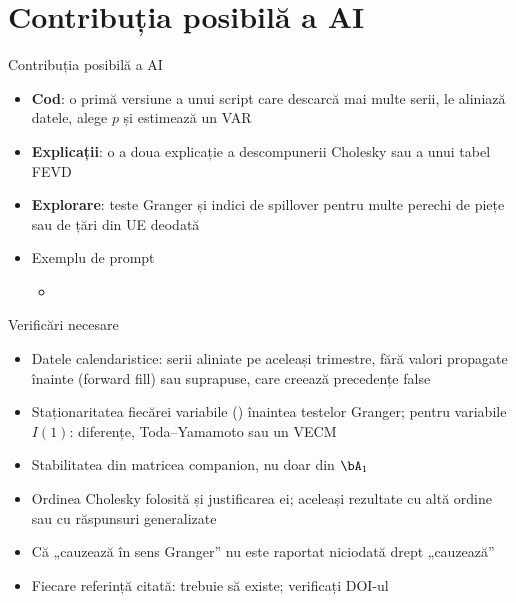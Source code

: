 \section{Contribuția posibilă a AI}

\begin{frame}{Contribuția posibilă a AI}
\itemsize{\small}
\begin{itemize}
    \item \textbf{Cod}: o primă versiune a unui script care descarcă mai multe serii, le aliniază datele, alege $p$ și estimează un VAR
    \item \textbf{Explicații}: o a doua explicație a descompunerii Cholesky sau a unui tabel FEVD
    \item \textbf{Explorare}: teste Granger și indici de spillover pentru multe perechi de piețe sau de țări din UE deodată
    \item Exemplu de prompt
    \begin{itemize}
        \item {}
    \end{itemize}
\end{itemize}
\end{frame}

\begin{frame}{Verificări necesare}
\itemsize{\small}
\begin{itemize}
    \item Datele calendaristice: serii aliniate pe aceleași trimestre, fără valori propagate înainte (forward fill) sau suprapuse, care creează precedențe false
    \item Staționaritatea fiecărei variabile () înaintea testelor Granger; pentru variabile $I(1)$: diferențe, Toda--Yamamoto sau un VECM
    \item Stabilitatea din matricea companion, nu doar din $\bA_1$
    \item Ordinea Cholesky folosită și justificarea ei; aceleași rezultate cu altă ordine sau cu răspunsuri generalizate
    \item Că „cauzează în sens Granger” nu este raportat niciodată drept „cauzează”
    \item Fiecare referință citată: trebuie să existe; verificați DOI-ul
\end{itemize}
\end{frame}


